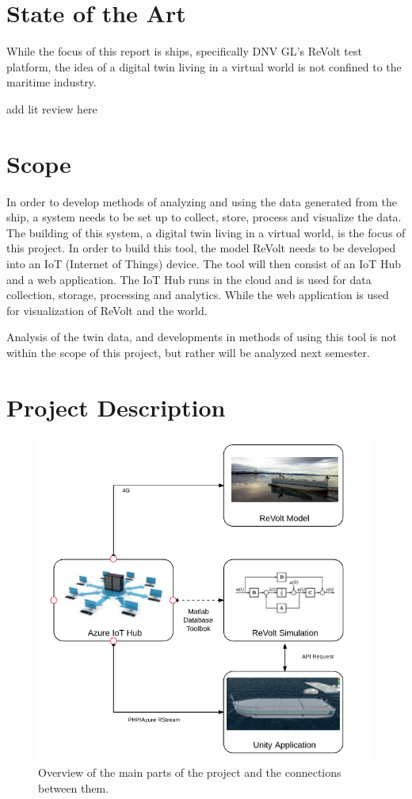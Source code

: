 \section{State of the Art}
While the focus of this report is ships, specifically DNV GL's ReVolt test platform, the idea of a digital twin living in a virtual world is not confined to the maritime industry. 


add lit review here

\section{Scope}
In order to develop methods of analyzing and using the data generated from the ship, a system needs to be set up to collect, store, process and visualize the data. The building of this system, a digital twin living in a virtual world, is the focus of this project. In order to build this tool, the model ReVolt needs to be developed into an IoT (Internet of Things) device. The tool will then consist of an IoT Hub and a web application. The IoT Hub runs in the cloud and is used for data collection, storage, processing and analytics. While the web application is used for visualization of ReVolt and the world.

Analysis of the twin data, and developments in methods of using this tool is not within the scope of this project, but rather will be analyzed next semester.

\section{Project Description}
\begin{figure}[H]
\centering
\includegraphics[scale=1.0]{Images/ProjectDescription.png}
\caption{Overview of the main parts of the project and the connections between them.}
\label{fig:ProjectDescription}
\end{figure}

